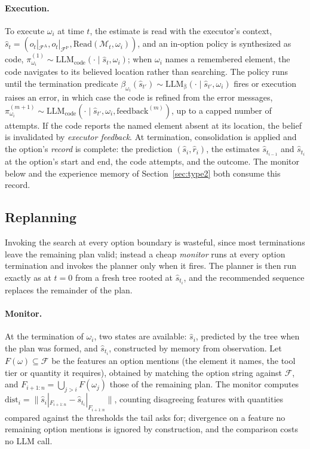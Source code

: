 \documentclass[10pt]{article}
\newcommand{\llm}[1]{\mathrm{LLM}_{\mathrm{#1}}}
\newcommand{\calF}{\mathcal{F}}
\newcommand{\calM}{\mathcal{M}}
\newcommand{\shat}{\hat{s}}
\newcommand{\FA}{\calF^{\mathrm{A}}}
\newcommand{\FP}{\calF^{\mathrm{P}}}
\newcommand{\Read}{\mathrm{Read}}
\newcommand{\dist}{\mathrm{dist}}
\begin{document}
\paragraph{Execution.}
To execute $\omega_i$ at time $t$, the estimate is read with the executor's context, $\shat_t=(o_t|_{\FA},\allowbreak o_t|_{\FP},\allowbreak\Read(\calM_t,\omega_i))$, and an in-option policy is synthesized as code, $\pi^{(1)}_{\omega_i}\sim\llm{code}(\cdot\mid\shat_t,\omega_i)$; when $\omega_i$ names a remembered element, the code navigates to its believed location rather than searching. The policy runs until the termination predicate $\beta_{\omega_i}(\shat_{t'})\sim\llm{\beta}(\cdot\mid\shat_{t'},\omega_i)$ fires or execution raises an error, in which case the code is refined from the error messages, $\pi^{(m+1)}_{\omega_i}\sim\llm{code}(\cdot\mid\shat_{t'},\omega_i,\mathrm{feedback}^{(m)})$, up to a capped number of attempts. If the code reports the named element absent at its location, the belief is invalidated by \emph{executor feedback}. At termination, consolidation is applied and the option's \emph{record} is complete: the prediction $(\shat_i,\hat r_i)$, the estimates $\shat_{t_{i-1}}$ and $\shat_{t_i}$ at the option's start and end, the code attempts, and the outcome. The monitor below and the experience memory of Section~\ref{sec:type2} both consume this record.

\subsection{Replanning}
\label{sec:type1-replan}

Invoking the search at every option boundary is wasteful, since most terminations leave the remaining plan valid; instead a cheap \emph{monitor} runs at every option termination and invokes the planner only when it fires. The planner is then run exactly as at $t=0$ from a fresh tree rooted at $\shat_{t_i}$, and the recommended sequence replaces the remainder of the plan.

\paragraph{Monitor.}
At the termination of $\omega_i$, two states are available: $\shat_i$, predicted by the tree when the plan was formed, and $\shat_{t_i}$, constructed by memory from observation. Let $F(\omega)\subseteq\calF$ be the features an option mentions (the element it names, the tool tier or quantity it requires), obtained by matching the option string against $\calF$, and $F_{i+1:n}=\bigcup_{j>i}F(\omega_j)$ those of the remaining plan. The monitor computes $\dist_i=\|\shat_i|_{F_{i+1:n}}-\shat_{t_i}|_{F_{i+1:n}}\|$, counting disagreeing features with quantities compared against the thresholds the tail asks for; divergence on a feature no remaining option mentions is ignored by construction, and the comparison costs no LLM call.
\end{document}
